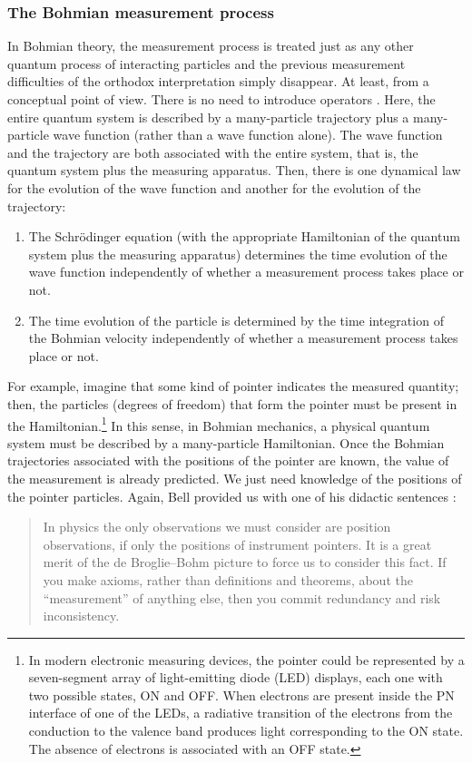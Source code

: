 \documentclass[nofootinbib, secnumarabic, amsmath, nobibnotes,10pt,aps,pra]{revtex4-1}
\begin{document}
\subsubsection{The Bohmian measurement process}\label{meabom}

In Bohmian theory, the measurement process is treated just as any
other quantum process of interacting particles and the previous
measurement difficulties of the orthodox interpretation simply
disappear. At least, from a conceptual point of view. There is no need to introduce operators
\cite{om.Durrnaive,om.Durrllibre,om.goldstein,om.reviewabc,om.llibreph}. Here, the entire
quantum system is described by a many-particle trajectory plus a many-particle wave function
(rather than a wave function alone). The wave function and the
trajectory are both associated with the entire system, that is, the
quantum system plus the measuring apparatus. Then, there is one dynamical law for
the evolution of the wave function and another  for the
evolution of the trajectory:\enlargethispage{1pc}
\begin{enumerate}
\item The Schr\"odinger equation (with the appropriate Hamiltonian of the quantum system plus the measuring apparatus) determines the time evolution of the wave function independently of whether a measurement process takes place or not.

\item The time evolution of the particle is determined by the time integration of the Bohmian velocity independently of whether a measurement process takes place or not.
\end{enumerate}

For example, imagine that some kind of pointer indicates the
measured quantity; then, the particles (degrees of freedom) that
form the pointer must be present in the Hamiltonian.\footnote{In
modern electronic measuring devices, the pointer could be
represented by a seven-segment array of light-emitting diode (LED)
displays, each one with two possible states, ON and OFF. When
electrons are present inside the PN interface of one of the LEDs, a
radiative transition of the electrons from the conduction to the
valence band produces light corresponding to the ON state. The
absence of electrons is associated with an OFF state.} In this
sense, in Bohmian mechanics, a physical quantum system must be described by a
many-particle Hamiltonian. Once the Bohmian
trajectories associated with the positions of the pointer are known,
the value of the measurement is already predicted. We just need
knowledge of the positions of the pointer particles. Again, Bell
provided us with one of his didactic sentences \cite{om.Bell1987}:
\begin{quote}
In physics the only observations we must consider are position
observations, if only the positions of instrument pointers. It is a
great merit of the de Broglie--Bohm picture to force us to consider
this fact. If you make axioms, rather than definitions and theorems,
about the ``measurement'' of anything else, then you commit
redundancy and risk inconsistency.\enlargethispage{1pc}
\end{quote}
\end{document}
